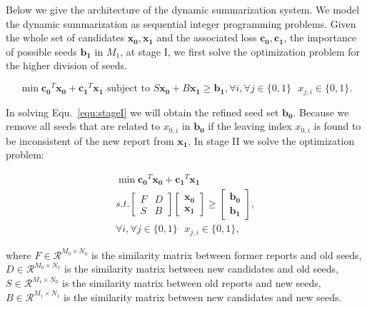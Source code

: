 \documentclass[runningheads]{llncs}
\begin{document}
Below we give the architecture of the dynamic summarization system. We model the dynamic summarization as sequential integer programming problems.  Given the whole set of candidates $\mathbf{x_0,x_1}$ and the associated loss $\mathbf{c_0,c_1}$, the importance of possible seeds $\mathbf{b_1}$ in $M_1$, at stage I, we first solve the optimization problem for the higher division of seeds.

\vspace{-0.6cm}
\begin{equation}\label{equ:stageI}
\min \mathbf{c_0}^T \mathbf{x_0} + \mathbf{c_1}^T \mathbf{x_1} \textrm{ subject to } S \mathbf{x_0} + B\mathbf{x_1} \geq \mathbf{b_1}, \forall i, \forall j\in \{0,1\}\textrm{ } x_{j,i}\in \{0,1\}.
\end{equation}
\vspace{-0.6cm}

In solving Equ.~\ref{equ:stageI} we will obtain the refined seed set $\mathbf{b_0}$. Because we remove all seeds that are related to $x_{0,i}$ in $\mathbf{b_0}$ if the leaving index $x_{0,i}$ is found to be inconsistent of the new report from $\mathbf{x_{1}}$. In stage II we solve the optimization problem:

\vspace{-0.6cm}
\begin{eqnarray}
\min \mathbf{c_0}^T \mathbf{x_0}+\mathbf{c_1}^T\mathbf{x_1}\\\nonumber
s.t. \begin{bmatrix}
F & D \\
S & B
\end{bmatrix}\begin{bmatrix}
 \mathbf{x_0}\\
\mathbf{x_1}
\end{bmatrix}\geq \begin{bmatrix}
\mathbf{b_0}\\
\mathbf{b_1}
\end{bmatrix},\\\nonumber
 \forall i, \forall j\in \{0,1\}\textrm{ } x_{j,i}\in \{0,1\},
\end{eqnarray}
\vspace{-0.6cm}

where $F\in \mathcal{R}^{M_0\times N_0}$ is the similarity matrix between former reports and old seeds, $D\in \mathcal{R}^{M_0\times N_1}$ is the similarity matrix between new candidates and old seeds, $S\in \mathcal{R}^{M_1\times N_0}$ is the similarity matrix between old reports and new seeds, $B\in \mathcal{R}^{M_1 \times N_1}$ is the similarity matrix between new candidates and new seeds.
\end{document}
